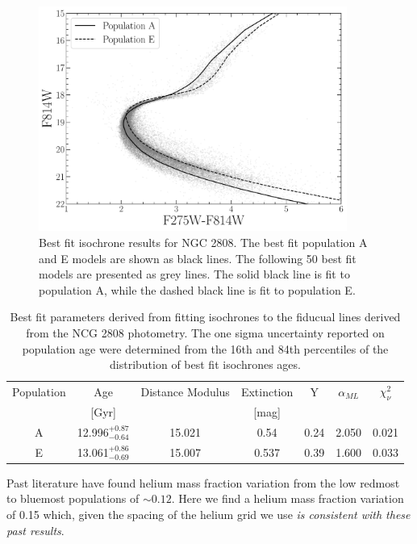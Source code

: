 \begin{figure}
  \centering
  \includegraphics[width=0.9\textwidth]{figures/ngc2808/BestFitResults.pdf}
  \caption{Best fit isochrone results for NGC 2808. The best fit population A
  and E models are shown as black lines. The following 50 best fit models are
  presented as grey lines. The solid black line is fit to population A, while
  the dashed black line is fit to population E.}
  \label{fig:BestFitResults}
\end{figure}

\begin{table}
  \centering
  \begin{tabular}{c | c c c c c c}
    \hline
    Population & Age & Distance Modulus & Extinction & Y & $\alpha_{ML}$ & $\chi^{2}_{\nu}$\\
    & [Gyr] & & [mag] & & &\\
    \hline
    \hline
    A & 12.996$^{+0.87}_{-0.64}$ & 15.021 & 0.54 & 0.24 & 2.050 & 0.021\\
    E & 13.061$^{+0.86}_{-0.69}$ & 15.007 & 0.537 & 0.39 & 1.600 & 0.033 \\
    \hline
  \end{tabular}
  \caption{Best fit parameters derived from fitting isochrones to the fiducual lines derived from the NCG 2808 photometry. The one sigma uncertainty reported on population age were determined from the 16th and 84th percentiles of the distribution of best fit isochrones ages.}
  \label{tab:BestFitResults}
\end{table}


Past literature \citep[e.g. ][]{Milone2015, Milone2018} have found helium mass
fraction variation from the low redmost to bluemost populations of $\sim 0.12$.
Here we find a helium mass fraction variation of 0.15 which, given the spacing
of the helium grid we use {\em is consistent with these past results}.

